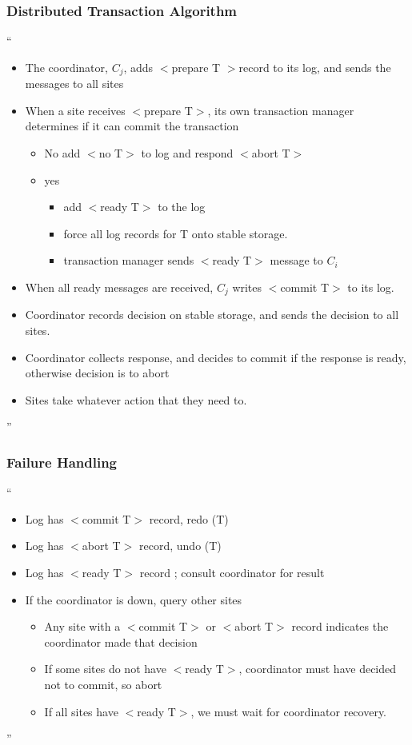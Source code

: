 \documentclass[11pt]{article}
\begin{document}
\subsubsection {Distributed Transaction Algorithm}
`` \begin{itemize}
\item The coordinator, $C_j$,  adds $<$prepare T $>$record to its log, and sends the messages to all sites
\item When a site receives $<$prepare T$>$, its own transaction manager determines if it can commit the transaction
\begin{itemize}
\item No add $<$no T$>$ to log and respond $<$abort T$>$
\item yes
\begin{itemize}
\item add $<$ready T$>$ to the log 
\item force all log records for T onto stable storage.
\item transaction manager sends $<$ready T$>$ message to $C_i$
\end{itemize}

\end{itemize}
\item When all ready messages are received, $C_j$ writes $<$commit T$>$ to its log.
\item Coordinator records decision on stable storage, and sends the decision to all sites. 
\item Coordinator collects response, and decides to commit if the response is ready, otherwise decision is to abort
\item Sites take whatever action that they need to.

\end{itemize}''

\subsubsection {Failure Handling}
``\begin{itemize}
\item Log has $<$commit T$>$ record, redo (T)
\item Log has $<$abort T$>$ record, undo (T) 
\item Log has $<$ready T$>$ record ; consult coordinator for result
\item If the coordinator is down, query other sites
\begin{itemize}
\item Any site with a $<$commit T$>$ or $<$abort T$>$ record indicates the coordinator made that decision
\item If some sites do not have $<$ready T$>$, coordinator must have decided not to commit, so abort
\item If all sites have $<$ready T$>$, we must wait for coordinator recovery.  
\end{itemize}

\end{itemize}
''
		
\end{document}
